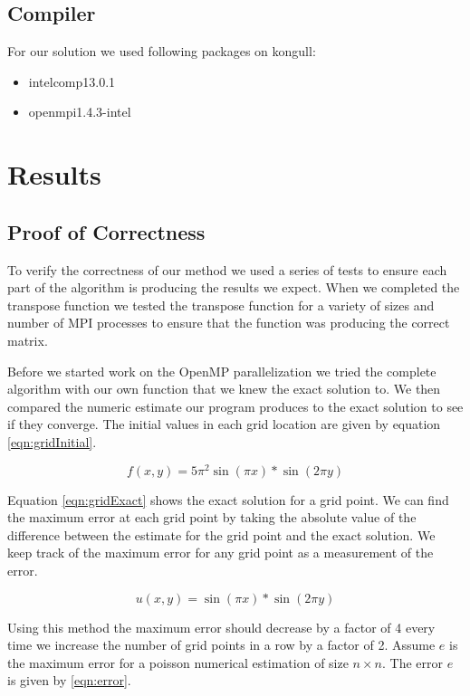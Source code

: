 \documentclass{article}
\begin{document}
\subsection{Compiler}

For our solution we used following packages on kongull:
\begin{itemize}
\item intelcomp13.0.1
\item openmpi1.4.3-intel
\end{itemize}
\section{Results}
\subsection{Proof of Correctness}
	To verify the correctness of our method we used a series of tests to ensure each part of the algorithm is producing the results we expect. When we completed the transpose function we tested the transpose function for a variety of sizes and number of MPI processes to ensure that the function was producing the correct matrix. 

	Before we started work on the OpenMP parallelization we tried the complete algorithm with our own function that we knew the exact solution to. We then compared the numeric estimate our program produces to the exact solution to see if they converge. The initial values in each grid location are given by equation \ref{eqn:gridInitial}.

	\begin{equation}
		\label{eqn:gridInitial}
		f(x,y) = 5\pi^2 \sin(\pi x)* \sin(2\pi y)
	\end{equation}

	Equation \ref{eqn:gridExact} shows the exact solution for a grid point. We can find the maximum error at each grid point by taking the absolute value of the difference between the estimate for the grid point and the exact solution. We keep track of the maximum error for any grid point as a measurement of the error.

	\begin{equation}
		\label{eqn:gridExact}
		u(x,y) = \sin(\pi x) * \sin(2 \pi y)
	\end{equation}

	Using this method the maximum error should decrease by a factor of 4 every time we increase the number of grid points in a row by a factor of 2. Assume $e$ is the maximum error for a poisson numerical estimation of size $n \times n$. The error $e$ is given by \ref{eqn:error}.
\end{document}
